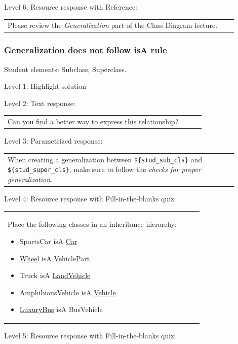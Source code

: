 \noindent Level 6: Resource response with Reference: \medskip

\begin{tabular}{|p{0.9\linewidth}}
Please review the \textit{Generalization} part of the Class Diagram lecture.
\end{tabular} \medskip


\subsubsection{Generalization does not follow isA rule}

Student elements: Subclass, Superclass.  \medskip

\noindent Level 1: Highlight solution  \medskip

\noindent Level 2: Text response: \medskip

\begin{tabular}{|p{0.9\linewidth}}
Can you find a better way to express this relationship?
\end{tabular} \medskip

\noindent Level 3: Parametrized response: \medskip

\begin{tabular}{|p{0.9\linewidth}}
When creating a generalization between \verb|${stud_sub_cls}| and \verb|${stud_super_cls}|, make sure to follow the \textit{checks for proper generalization}.
\end{tabular} \medskip

\noindent Level 4: Resource response with Fill-in-the-blanks quiz: \medskip

\begin{tabular}{|p{0.9\linewidth}}

Place the following classes in an inheritance hierarchy:

\begin{itemize}
    \item SportsCar isA \underline{Car}
    \item \underline{Wheel} isA VehiclePart
    \item Truck isA \underline{LandVehicle}
    \item AmphibiousVehicle isA \underline{Vehicle}
    \item \underline{LuxuryBus} isA BusVehicle
\end{itemize}

\end{tabular} \medskip

\noindent Level 5: Resource response with Fill-in-the-blanks quiz: \medskip

